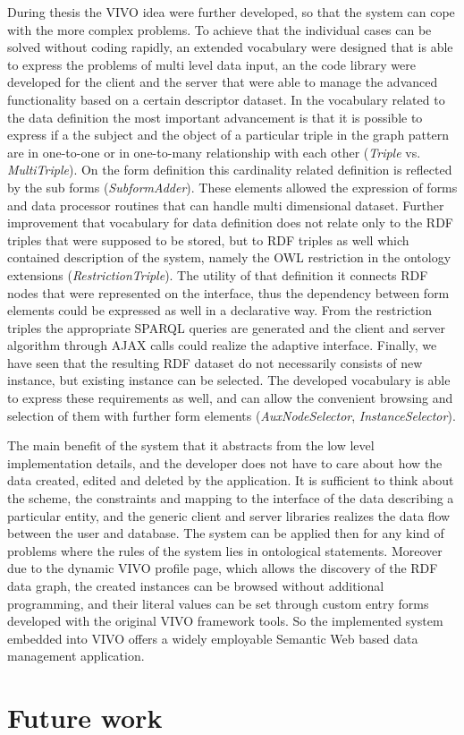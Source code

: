 During thesis the VIVO idea were further developed, so that the system can cope with the more complex problems. To achieve that the individual cases can be solved without coding rapidly, an extended vocabulary were designed that is able to express the problems of multi level data input, an the code library were developed for the client and the server that were able to manage the advanced functionality based on a certain descriptor dataset. In the vocabulary related to the data definition the most important advancement is that it is possible to express if a the subject and the object of a particular triple in the graph pattern are in one-to-one or in one-to-many relationship with each other (\textit{Triple} vs. \textit{MultiTriple}). On the form definition this cardinality related definition is reflected by the sub forms (\textit{SubformAdder}). These elements allowed the expression of forms and data processor routines that can handle multi dimensional dataset. Further improvement that vocabulary for data definition does not relate only to the RDF triples that were supposed to be stored, but to RDF triples as well which contained description of the system, namely the OWL restriction in the ontology extensions (\textit{RestrictionTriple}). The utility of that definition it connects RDF nodes that were represented on the interface, thus the dependency between form elements could be expressed as well in a declarative way. From the restriction triples the appropriate SPARQL queries are generated and the client and server algorithm through AJAX calls could realize the adaptive interface. Finally, we have seen that the resulting RDF dataset do not necessarily consists of new instance, but existing instance can be selected. The developed vocabulary is able to express these requirements as well, and can allow the convenient browsing and selection of them with further form elements (\textit{AuxNodeSelector}, \textit{InstanceSelector}). 


The main benefit of the system that it abstracts from the low level implementation details, and the developer does not have to care about how the data created, edited and deleted by the application. It is sufficient to think about the scheme, the constraints and mapping to the interface of the data describing a particular entity, and the generic client and server libraries realizes the data flow between the user and database. The system can be applied then for any kind of problems where the rules of the system lies in ontological statements. Moreover due to the dynamic VIVO profile page, which allows the discovery of the RDF data graph, the created instances can be browsed without additional programming, and their literal values can be set through custom entry forms developed with the original VIVO framework tools. So the implemented system embedded into VIVO offers a widely employable Semantic Web based data management application.


\section{Future work}


